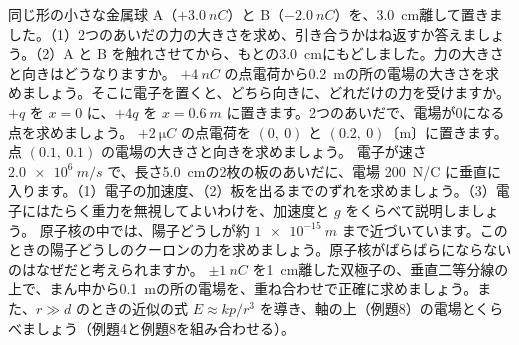 \bkendproblems
{}
\bkproblem 同じ形の小さな金属球 A（$+\qty{3.0}{nC}$）と B（$-\qty{2.0}{nC}$）を、\qty{3.0}{cm}離して置きました。（1）2つのあいだの力の大きさを求め、引き合うかはね返すか答えましょう。（2）A と B を触れさせてから、もとの\qty{3.0}{cm}にもどしました。力の大きさと向きはどうなりますか。
\bkproblem $+\qty{4}{nC}$ の点電荷から\qty{0.2}{m}の所の電場の大きさを求めましょう。そこに電子を置くと、どちら向きに、どれだけの力を受けますか。
\bkproblem $+q$ を $x=0$ に、$+4q$ を $x=\qty{0.6}{m}$ に置きます。2つのあいだで、電場が0になる点を求めましょう。
\bkproblem $+\qty{2}{\micro C}$ の点電荷を $(0,\ 0)$ と $(0.2,\ 0)$〔m〕に置きます。点 $(0.1,\ 0.1)$ の電場の大きさと向きを求めましょう。
\bkproblem 電子が速さ $\qty{2.0e6}{m/s}$ で、長さ\qty{5.0}{cm}の2枚の板のあいだに、電場 \qty{200}{N/C} に垂直に入ります。（1）電子の加速度、（2）板を出るまでのずれを求めましょう。（3）電子にはたらく重力を無視してよいわけを、加速度と $g$ をくらべて説明しましょう。
\bkproblem 原子核の中では、陽子どうしが約 $\qty{1e-15}{m}$ まで近づいています。このときの陽子どうしのクーロンの力を求めましょう。原子核がばらばらにならないのはなぜだと考えられますか。
\bkproblem $\pm\qty{1}{nC}$ を\qty{1}{cm}離した双極子の、垂直二等分線の上で、まん中から\qty{0.1}{m}の所の電場を、重ね合わせで正確に求めましょう。また、$r\gg d$ のときの近似の式 $E\approx kp/r^3$ を導き、軸の上（例題8）の電場とくらべましょう（例題4と例題8を組み合わせる）。
